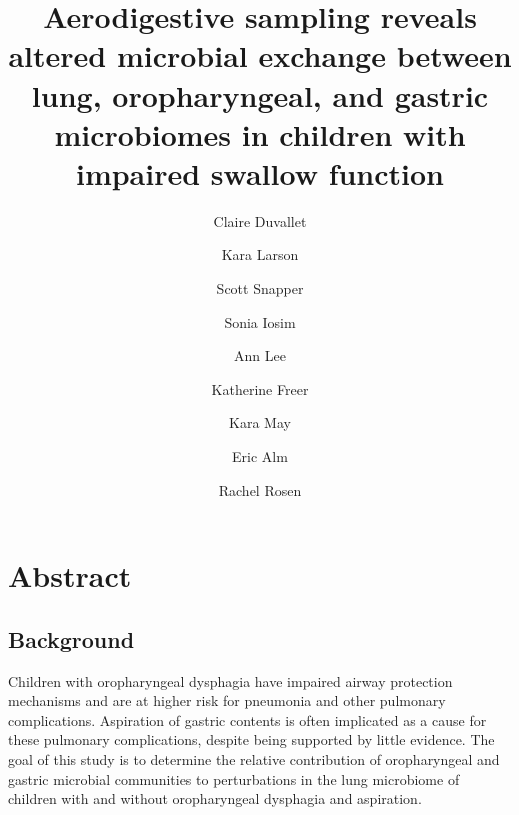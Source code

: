 \documentclass{article}
\begin{document}
\title{Aerodigestive sampling reveals altered microbial exchange between lung, oropharyngeal, and gastric microbiomes in children with impaired swallow function}

\author[1,2]{Claire Duvallet}
\author[3]{Kara Larson}
\author[4]{Scott Snapper}
\author[3]{Sonia Iosim}
\author[4]{Ann Lee}
\author[4]{Katherine Freer}
\author[5]{Kara May}
\author[1,2]{Eric Alm}
\author[3,*]{Rachel Rosen}
\date{}

\maketitle

\linenumbers

\section{Abstract}

\subsection{Background}

Children with oropharyngeal dysphagia have impaired airway protection mechanisms and are at higher risk for pneumonia and other pulmonary complications. 
Aspiration of gastric contents is often implicated as a cause for these pulmonary complications, despite being supported by little evidence. 
The goal of this study is to determine the relative contribution of oropharyngeal and gastric microbial communities to perturbations in the lung microbiome of children with and without oropharyngeal dysphagia and aspiration.
\end{document}
